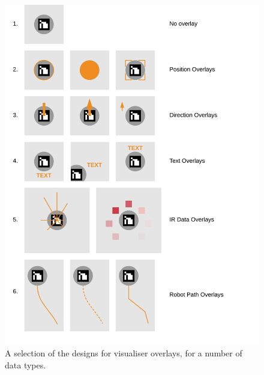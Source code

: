 \begin{figure}
	\centering
	\includegraphics[scale=1]{Figures/OverlayDesigns.png}
	\decoRule
	\caption[Visualiser Overlay Designs]{A selection of the designs for visualiser overlays, for a number of data types.}
	\label{fig:OverlayDesigns}
\end{figure}

